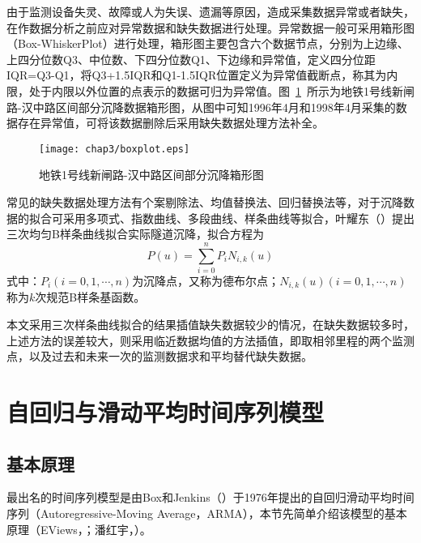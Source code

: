 由于监测设备失灵、故障或人为失误、遗漏等原因，造成采集数据异常或者缺失，在作数据分析之前应对异常数据和缺失数据进行处理。异常数据一般可采用箱形图（Box-WhiskerPlot）进行处理，箱形图主要包含六个数据节点，分别为上边缘、上四分位数Q3、中位数、下四分位数Q1、下边缘和异常值，定义四分位距IQR=Q3-Q1，将Q3+1.5IQR和Q1-1.5IQR位置定义为异常值截断点，称其为内限，处于内限以外位置的点表示的数据可归为异常值。图~\ref{fig:地铁1号线新闸路-汉中路区间部分沉降箱形图}~所示为地铁1号线新闸路-汉中路区间部分沉降数据箱形图，从图中可知1996年4月和1998年4月采集的数据存在异常值，可将该数据删除后采用缺失数据处理方法补全。

\begin{figure}[htb!]
    \centering
    \texttt{[image: chap3/boxplot.eps]}
    \caption{地铁1号线新闸路-汉中路区间部分沉降箱形图}
    \label{fig:地铁1号线新闸路-汉中路区间部分沉降箱形图}
\end{figure}

常见的缺失数据处理方法有个案剔除法、均值替换法、回归替换法等，对于沉降数据的拟合可采用多项式、指数曲线、多段曲线、样条曲线等拟合，叶耀东（\citeyear{叶耀东2007软土地区运营地铁盾构隧道结构变形及健康诊断方法研究}）提出三次均匀B样条曲线拟合实际隧道沉降，拟合方程为
\begin{equation}
    P(u)=\sum\limits_{i=0}^{n}{{{P}_{i}}{{N}_{i,k}}(u)}
\end{equation}
式中：${{P}_{i}}(i=0,1,\cdots ,n)$为沉降点，又称为德布尔点；${{N}_{i,k}}(u)(i=0,1,\cdots ,n)$称为$k$次规范B样条基函数。

本文采用三次样条曲线拟合的结果插值缺失数据较少的情况，在缺失数据较多时，上述方法的误差较大，则采用临近数据均值的方法插值，即取相邻里程的两个监测点，以及过去和未来一次的监测数据求和平均替代缺失数据。


\section{自回归与滑动平均时间序列模型}

\subsection{基本原理}

最出名的时间序列模型是由Box和Jenkins（\citeyear{box2015time}）于1976年提出的自回归滑动平均时间序列（Autoregressive-Moving Average，ARMA），本节先简单介绍该模型的基本原理（EViews，\citeyear{noble2011eviews}；潘红宇，\citeyear{cryer2011时间序列分析及应用}）。


